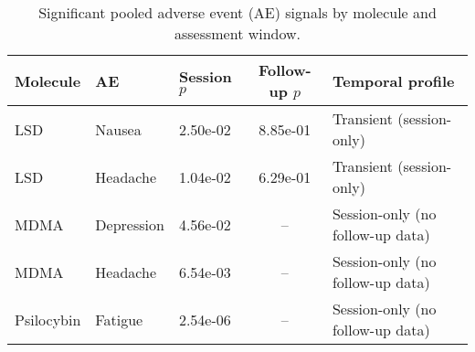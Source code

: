 \begin{table}[htbp]
  \centering
  \caption{Significant pooled adverse event (AE) signals by molecule and assessment window.}
  \label{tab:ae-transition}
  \begin{tabular}{lllcl}
    \toprule
    Molecule & AE & Session $p$ & Follow-up $p$ & Temporal profile \\
    \midrule
    LSD & Nausea & 2.50e-02 & 8.85e-01 & Transient (session-only) \\
    LSD & Headache & 1.04e-02 & 6.29e-01 & Transient (session-only) \\
    MDMA & Depression & 4.56e-02 & -- & Session-only (no follow-up data) \\
    MDMA & Headache & 6.54e-03 & -- & Session-only (no follow-up data) \\
    Psilocybin & Fatigue & 2.54e-06 & -- & Session-only (no follow-up data) \\
    \bottomrule
  \end{tabular}
\end{table}
